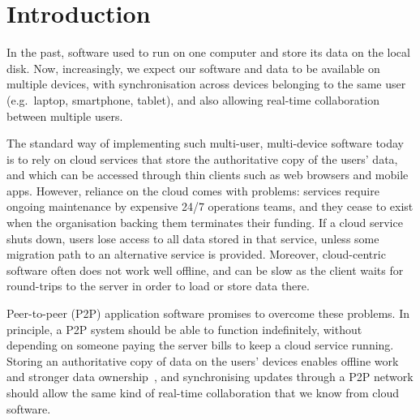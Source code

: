 \documentclass[sigplan,10pt]{acmart}
\begin{document}


\maketitle

\section{Introduction}

In the past, software used to run on one computer and store its data on the local disk.
Now, increasingly, we expect our software and data to be available on multiple devices, with synchronisation across devices belonging to the same user (e.g.\ laptop, smartphone, tablet), and also allowing real-time collaboration between multiple users.

The standard way of implementing such multi-user, multi-device software today is to rely on cloud services that store the authoritative copy of the users' data, and which can be accessed through thin clients such as web browsers and mobile apps.
However, reliance on the cloud comes with problems: services require ongoing maintenance by expensive 24/7 operations teams, and they cease to exist when the organisation backing them terminates their funding.
If a cloud service shuts down, users lose access to all data stored in that service, unless some migration path to an alternative service is provided.
Moreover, cloud-centric software often does not work well offline, and can be slow as the client waits for round-trips to the server in order to load or store data there.

Peer-to-peer (P2P) application software promises to overcome these problems.
In principle, a P2P system should be able to function indefinitely, without depending on someone paying the server bills to keep a cloud service running.
Storing an authoritative copy of data on the users' devices enables offline work and stronger data ownership~\cite{LocalFirst}, and synchronising updates through a P2P network should allow the same kind of real-time collaboration that we know from cloud software.
\end{document}
